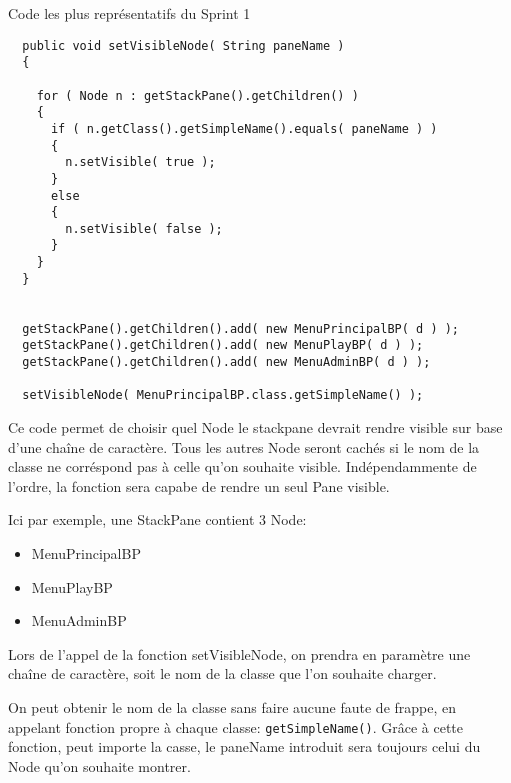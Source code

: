 Code les plus représentatifs du Sprint 1
\begin{lstlisting}
  public void setVisibleNode( String paneName )
  {

    for ( Node n : getStackPane().getChildren() )
    {
      if ( n.getClass().getSimpleName().equals( paneName ) )
      {
        n.setVisible( true );
      }
      else
      {
        n.setVisible( false );
      }
    }
  }
  

  getStackPane().getChildren().add( new MenuPrincipalBP( d ) );
  getStackPane().getChildren().add( new MenuPlayBP( d ) );
  getStackPane().getChildren().add( new MenuAdminBP( d ) );

  setVisibleNode( MenuPrincipalBP.class.getSimpleName() );
\end{lstlisting}

Ce code permet de choisir quel Node le stackpane devrait rendre visible sur base d'une chaîne de caractère.
Tous les autres Node seront cachés si le nom de la classe ne corréspond pas à celle qu'on souhaite visible.
Indépendammente de l'ordre, la fonction sera capabe de rendre un seul Pane visible.

Ici par exemple, une StackPane contient 3 Node:
\begin{itemize}
\item MenuPrincipalBP
\item MenuPlayBP
\item MenuAdminBP
\end{itemize}

Lors de l'appel de la fonction setVisibleNode, on prendra en paramètre une chaîne de caractère, soit le nom de la classe que l'on souhaite charger.

On peut obtenir le nom de la classe sans faire aucune faute de frappe, en appelant fonction propre à chaque classe: \verb|getSimpleName()|.
Grâce à cette fonction, peut importe la casse, le paneName introduit sera toujours celui du Node qu'on souhaite montrer.
